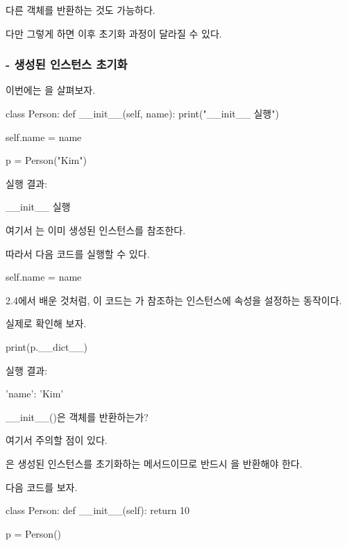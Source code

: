 다른 객체를 반환하는 것도 가능하다.

다만 그렇게 하면 이후 초기화 과정이 달라질 수 있다.

\subsubsection{ - 생성된 인스턴스 초기화}

이번에는 을 살펴보자.

\begin{dhkcode}
class Person:
    def __init__(self, name):
        print("__init__ 실행")

        self.name = name

p = Person("Kim")
\end{dhkcode}

실행 결과:

\begin{dhkzsh}
__init__ 실행
\end{dhkzsh}

여기서 는 이미 생성된  인스턴스를 참조한다.

따라서 다음 코드를 실행할 수 있다.

\begin{dhkcode}
self.name = name
\end{dhkcode}

2.4에서 배운 것처럼, 이 코드는 가 참조하는 인스턴스에  속성을 설정하는 동작이다.

실제로 확인해 보자.

\begin{dhkcode}
print(p.__dict__)
\end{dhkcode}

실행 결과:

\begin{dhkzsh}
{'name': 'Kim'}
\end{dhkzsh}

\begin{dhknote}
\begin{dhksmry}[centered]
__init__()은 객체를 반환하는가?
\end{dhksmry}
\end{dhknote}

여기서 주의할 점이 있다.

은 생성된 인스턴스를 초기화하는 메서드이므로 반드시 을 반환해야 한다.

다음 코드를 보자.

\begin{dhkcode}
class Person:
    def __init__(self):
        return 10


p = Person()
\end{dhkcode}


